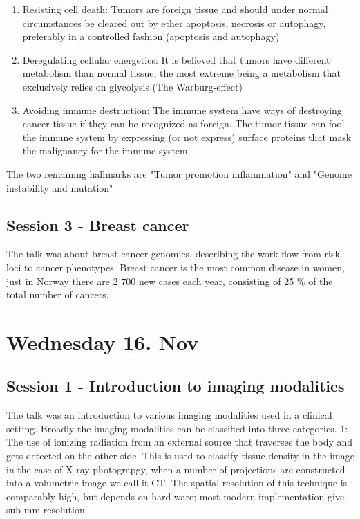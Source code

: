 \documentclass[12p]{article}
\begin{document}
\begin{enumerate}
  \item
    Resisting cell death:
    Tumors are foreign tissue and should under normal circumstances be cleared out by ether apoptosis, necrosis or autophagy, preferably in a controlled fashion (apoptosis and autophagy)
  \item
    Deregulating cellular energetics:
    It is believed that tumors have different metabolism than normal tissue, the most extreme being a metabolism that exclusively relies on glycolysis (The Warburg-effect)
  \item
    Avoiding immune destruction:
    The immune system have ways of destroying cancer tissue if they can be recognized as foreign.
    The tumor tissue can fool the immune system by expressing (or not express) surface proteins that mask the malignancy for the immune system.

\end{enumerate}
    
The two remaining hallmarks are "Tumor promotion inflammation" and "Genome instability and mutation"

\subsection*{Session 3 - Breast cancer}

The talk was about breast cancer genomics, describing the work flow from risk loci to cancer phenotypes.
Breast cancer is the most common disease in women, just in Norway there are 2 700 new cases each year, consisting of 25 \% of the total number of cancers.


\section*{Wednesday 16. Nov}

\subsection*{Session 1 - Introduction to imaging modalities}

The talk was an introduction to various imaging modalities used in a clinical setting.
Broadly the imaging modalities can be classified into three categories.
1: The use of ionizing radiation from an external source that traverses the body and gets detected on the other side.
This is used to classify tissue density in the image in the case of X-ray photograpgy, when a number of projections are constructed into a volumetric image we call it CT.
The spatial resolution of this technique is comparably high, but depends on hard-ware; most modern implementation give sub mm resolution.
\end{document}
